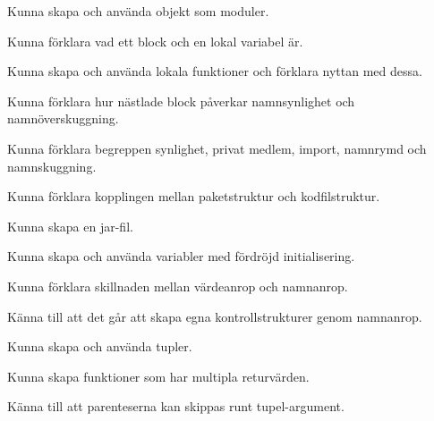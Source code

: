 
\item Kunna skapa och använda objekt som moduler.
\item Kunna förklara vad ett block och en lokal variabel är.
\item Kunna skapa och använda lokala funktioner och förklara nyttan med dessa.
\item Kunna förklara hur nästlade block påverkar namnsynlighet och namnöverskuggning.
\item Kunna förklara begreppen synlighet, privat medlem, import, namnrymd och namnskuggning.

\item Kunna förklara kopplingen mellan paketstruktur och kodfilstruktur.
\item Kunna skapa en jar-fil.

\item Kunna skapa och använda variabler med fördröjd initialisering.
\item Kunna förklara skillnaden mellan värdeanrop och namnanrop.
\item Känna till att det går att skapa egna kontrollstrukturer genom namnanrop.

\item Kunna skapa och använda tupler.
\item Kunna skapa funktioner som har multipla returvärden.
\item Känna till att parenteserna kan skippas runt tupel-argument.
